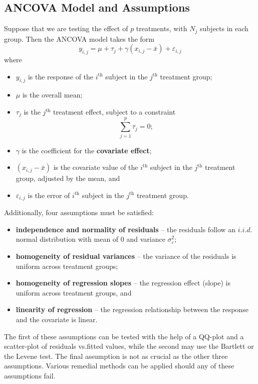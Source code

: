 \subsection{ANCOVA Model and Assumptions}
Suppose that we are testing the effect of $p$ treatments, with $N_{j}$ subjects in each group. Then the ANCOVA model takes the form
\begin{equation}\label{eq:ANCOVA}
    y_{i,j}=\mu+\tau_{j}+\gamma (x_{i,j}-\bar{x})+\varepsilon_{i,j}
\end{equation}
where 
\begin{itemize}[noitemsep]
    \item $y_{i,j}$ is the response of the $i^{\text{th}}$ subject in the $j^{\text{th}}$ treatment group;
    \item $\mu$ is the overall mean;
    \item $\tau_{j}$ is the $j^{\text{th}}$ treatment effect, subject to a constraint $$\sum_{j=1}^{p}\tau_{j}=0;$$
    \item $\gamma$ is the coefficient for the \textbf{covariate effect};
    \item $(x_{i,j}-\bar{x})$ is the covariate value of the $i^{\text{th}}$ subject in the $j^{\text{th}}$ treatment group, adjusted by the mean, and
    \item $\varepsilon_{i,j}$ is the error of $i^{\text{th}}$ subject in the $j^{\text{th}}$ treatment group.
\end{itemize}
Additionally, four assumptions must be satisfied:
\begin{itemize}[noitemsep]
    \item \textbf{independence and normality of residuals} -- the residuals follow an ${i.i.d.}$ normal distribution with mean of $0$ and variance $\sigma^{2}_{\varepsilon}$;
    \item \textbf{homogeneity of residual variances} -- the variance of the residuals is uniform across treatment groups;
    \item \textbf{homogeneity of regression slopes} -- the regression effect (slope) is uniform across treatment groups, and
    \item \textbf{linearity of regression} -- the regression relationship between the response and the covariate is linear.
\end{itemize}
The first of these assumptions can be tested with the help of a QQ-plot and a scatter-plot of residuals vs.\@ fitted values, while the second may use the Bartlett or the Levene test. The final assumption is not as crucial as the other three assumptions. Various remedial methods can be applied should any of these assumptions fail.  
